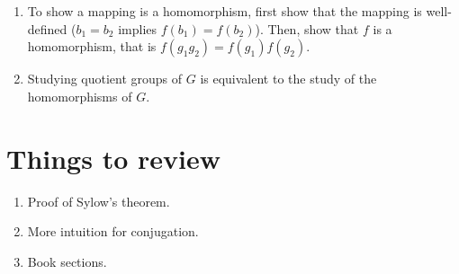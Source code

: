 \documentclass[12pt]{article}
\begin{document}
\begin{enumerate}
  \item To show a mapping is a homomorphism, first show that the mapping is well-defined ($b_1 = b_2$ implies $f(b_1) = f(b_2)$).  Then, show that $f$ is a homomorphism, that is $f(g_1 g_2) = f(g_1) f(g_2)$.
  \item Studying quotient groups of $G$ is equivalent to the study of the homomorphisms of $G$.
\end{enumerate}


\section{Things to review}

\begin{enumerate}
  \item Proof of Sylow's theorem.
  \item More intuition for conjugation.
  \item Book sections.
\end{enumerate}
\end{document}
